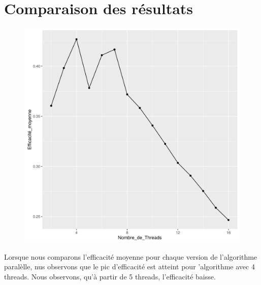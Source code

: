\documentclass[a4paper,11pt]{scrartcl}
\begin{document}
\section{Comparaison des r\'esultats}
\begin{figure}[H] \center
    \includegraphics[scale=0.5] {graphes/compEff.png}
\end{figure}
Lorsque nous comparons l'efficacit\'e moyenne pour chaque version de l'algorithme paral\`elle, nus observons que le pic d'efficacit\'e est atteint pour 'algorithme avec 4 threads. Nous observons, qu'\`a partir de 5 threads, l'efficacit\'e baisse. 
\end{document}
